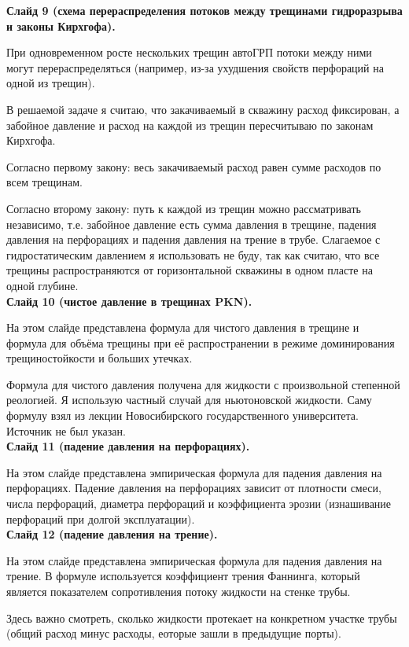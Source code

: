 \documentclass[a4paper, 12pt]{article}
\begin{document}
\textbf{Слайд 9 (схема перераспределения потоков между трещинами гидроразрыва и законы Кирхгофа).}

При одновременном росте нескольких трещин автоГРП потоки между ними могут перераспределяться (например, из-за ухудшения свойств перфораций на одной из трещин).

В решаемой задаче я считаю, что закачиваемый в скважину расход фиксирован, а забойное давление и расход на каждой из трещин пересчитываю по законам Кирхгофа.

Согласно первому закону: весь закачиваемый расход равен сумме расходов по всем трещинам.

Согласно второму закону: путь к каждой из трещин можно рассматривать независимо, т.е. забойное давление есть сумма давления в трещине, падения давления на перфорациях и падения давления на трение в трубе.
Слагаемое с гидростатическим давлением я использовать не буду, так как считаю, что все трещины распространяются от горизонтальной скважины в одном пласте на одной глубине.\\

\textbf{Слайд 10 (чистое давление в трещинах PKN).}

На этом слайде представлена формула для чистого давления в трещине и формула для объёма трещины при её распространении в режиме доминирования трещиностойкости и больших утечках.

Формула для чистого давления получена для жидкости с произвольной степенной реологией.
Я использую частный случай для ньютоновской жидкости.
Саму формулу взял из лекции Новосибирского государственного университета.
Источник не был указан.\\

\textbf{Слайд 11 (падение давления на перфорациях).}

На этом слайде представлена эмпирическая формула для падения давления на перфорациях.
Падение давления на перфорациях зависит от плотности смеси, числа перфораций, диаметра перфораций и коэффициента эрозии (изнашивание перфораций при долгой эксплуатации).\\

\textbf{Слайд 12 (падение давления на трение).}

На этом слайде представлена эмпирическая формула для падения давления на трение.
В формуле используется коэффициент трения Фаннинга, который является показателем сопротивления потоку жидкости на стенке трубы.

Здесь важно смотреть, сколько жидкости протекает на конкретном участке трубы (общий расход минус расходы, еоторые зашли в предыдущие порты).\\
\end{document}
